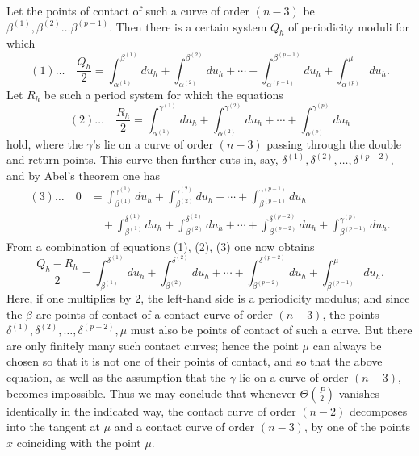 \documentclass[10pt]{article}
\begin{document}
Let the points of contact of such a curve of order \((n-3)\) be \(\beta^{(1)},\beta^{(2)}\ldots\beta^{(p-1)}\). Then there is a certain system \(Q_h\) of periodicity moduli for which
\[
(1)\ldots\quad
\frac{Q_h}{2}
=\int_{\alpha^{(1)}}^{\beta^{(1)}}du_h
+\int_{\alpha^{(2)}}^{\beta^{(2)}}du_h
+\cdots+
\int_{\alpha^{(p-1)}}^{\beta^{(p-1)}}du_h
+\int_{\alpha^{(p)}}^{\mu}du_h.
\]
Let \(R_h\) be such a period system for which the equations
\[
(2)\ldots\quad
\frac{R_h}{2}
=\int_{\alpha^{(1)}}^{\gamma^{(1)}}du_h
+\int_{\alpha^{(2)}}^{\gamma^{(2)}}du_h
+\cdots+
\int_{\alpha^{(p)}}^{\gamma^{(p)}}du_h
\]
hold, where the \(\gamma\)'s lie on a curve of order \((n-3)\) passing through the double and return points. This curve then further cuts in, say, \(\delta^{(1)},\delta^{(2)},\ldots,\delta^{(p-2)}\), and by Abel's theorem one has
\[
\begin{aligned}
(3)\ldots\quad 0
&=\int_{\beta^{(1)}}^{\gamma^{(1)}}du_h
+\int_{\beta^{(2)}}^{\gamma^{(2)}}du_h
+\cdots+
\int_{\beta^{(p-1)}}^{\gamma^{(p-1)}}du_h\\
&\quad{}+\int_{\beta^{(1)}}^{\delta^{(1)}}du_h
+\int_{\beta^{(2)}}^{\delta^{(2)}}du_h
+\cdots+
\int_{\beta^{(p-2)}}^{\delta^{(p-2)}}du_h
+\int_{\beta^{(p-1)}}^{\gamma^{(p)}}du_h.
\end{aligned}
\]
From a combination of equations (1), (2), (3) one now obtains
\[
\frac{Q_h-R_h}{2}
=\int_{\beta^{(1)}}^{\delta^{(1)}}du_h
+\int_{\beta^{(2)}}^{\delta^{(2)}}du_h
+\cdots+
\int_{\beta^{(p-2)}}^{\delta^{(p-2)}}du_h
+\int_{\beta^{(p-1)}}^{\mu}du_h.
\]
Here, if one multiplies by \(2\), the left-hand side is a periodicity modulus; and since the \(\beta\) are points of contact of a contact curve of order \((n-3)\), the points \(\delta^{(1)},\delta^{(2)},\ldots,\delta^{(p-2)},\mu\) must also be points of contact of such a curve. But there are only finitely many such contact curves; hence the point \(\mu\) can always be chosen so that it is not one of their points of contact, and so that the above equation, as well as the assumption that the \(\gamma\) lie on a curve of order \((n-3)\), becomes impossible. Thus we may conclude that whenever \(\Theta\left(\frac P2\right)\) vanishes identically in the indicated way, the contact curve of order \((n-2)\) decomposes into the tangent at \(\mu\) and a contact curve of order \((n-3)\), by one of the points \(x\) coinciding with the point \(\mu\).
\end{document}

